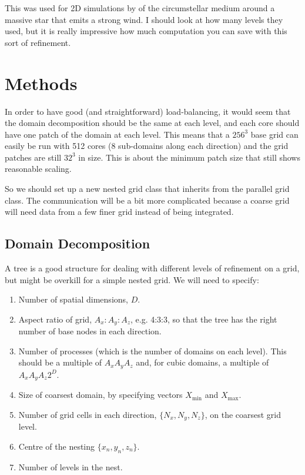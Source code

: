\documentclass[a4paper,11pt]{article}
\begin{document}
This was used for 2D simulations by \citet{FreHenYor03, FreHenYor06} of the circumstellar medium around a massive star that emits a strong wind.
I should look at how many levels they used, but it is really impressive how much computation you can save with this sort of refinement.

\section{Methods}
In order to have good (and straightforward) load-balancing, it would seem that the domain decomposition should be the same at each level, and each core should have one patch of the domain at each level.
This means that a $256^3$ base grid can easily be run with 512 cores (8 sub-domains along each direction) and the grid patches are still $32^3$ in size.
This is about the minimum patch size that still shows reasonable scaling.

So we should set up a new nested grid class that inherits from the parallel grid class.
The communication will be a bit more complicated because a coarse grid will need data from a few finer grid instead of being integrated.


\subsection{Domain Decomposition}
A tree is a good structure for dealing with different levels of refinement on a grid, but might be overkill for a simple nested grid.
We will need to specify:
\begin{enumerate}
\item Number of spatial dimensions, $D$.
\item Aspect ratio of grid, $A_x:A_y:A_z$, e.g. 4:3:3, so that the tree has the right number of base nodes in each direction.
\item Number of processes (which is the number of domains on each level).
This should be a multiple of $A_xA_yA_z$ and, for cubic domains, a multiple of $A_xA_yA_z2^D$.
\item Size of coarsest domain, by specifying vectors $X_\mathrm{min}$ and $X_\mathrm{max}$.
\item Number of grid cells in each direction, $\{N_x,N_y,N_z\}$, on the coarsest grid level.
\item Centre of the nesting $\{x_n,y_n,z_n\}$.
\item Number of levels in the nest.
\end{enumerate}
\end{document}
